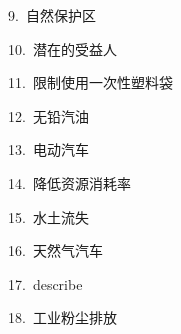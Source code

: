 \documentclass[a4paper, 12pt]{article}
\begin{document}
\begin{multicols}{2}
\begin{flushleft}
9.\ 自然保护区 \ \ \ \ \underline{\hspace{3cm}}
\end{flushleft}

\begin{flushleft}
10.\ 潜在的受益人 \ \ \ \ \underline{\hspace{3cm}}
\end{flushleft}
\end{multicols}

\begin{multicols}{2}
\begin{flushleft}
11.\ 限制使用一次性塑料袋 \ \ \ \ \underline{\hspace{3cm}}
\end{flushleft}

\begin{flushleft}
12.\ 无铅汽油 \ \ \ \ \underline{\hspace{3cm}}
\end{flushleft}
\end{multicols}

\begin{multicols}{2}
\begin{flushleft}
13.\ 电动汽车 \ \ \ \ \underline{\hspace{3cm}}
\end{flushleft}

\begin{flushleft}
14.\ 降低资源消耗率 \ \ \ \ \underline{\hspace{3cm}}
\end{flushleft}
\end{multicols}

\begin{multicols}{2}
\begin{flushleft}
15.\ 水土流失 \ \ \ \ \underline{\hspace{3cm}}
\end{flushleft}

\begin{flushleft}
16.\ 天然气汽车 \ \ \ \ \underline{\hspace{3cm}}
\end{flushleft}
\end{multicols}

\begin{multicols}{2}
\begin{flushleft}
17.\ describe \ \ \ \ \underline{\hspace{3cm}}
\end{flushleft}

\begin{flushleft}
18.\ 工业粉尘排放 \ \ \ \ \underline{\hspace{3cm}}
\end{flushleft}
\end{multicols}
\end{document}

